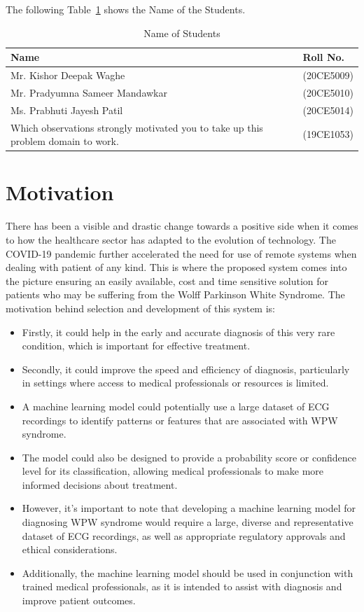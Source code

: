 The following Table~\ref{tab1} shows the Name of the Students.
\begin{table}[!ht] \label{tab1}
	\caption{Name of Students}
	\centering
	\begin{tabular}{|p{5cm}|p{5cm}|}
		\hline
		\textbf{Name}                  & \textbf{Roll No.} \\ \hline
		Mr. Kishor Deepak Waghe        & (20CE5009)        \\ \hline
		Mr. Pradyumna Sameer Mandawkar & (20CE5010)        \\ \hline
		Ms. Prabhuti Jayesh Patil      & (20CE5014)        \\ \hline
		Which observations strongly motivated you to take up this problem domain to work.      & (19CE1053)        \\ \hline
	\end{tabular}
\end{table}

\section{Motivation}
There has been a visible and drastic change towards a positive side when it comes to how the healthcare sector has adapted to the evolution of technology. The COVID-19 pandemic further accelerated the need for use of remote systems when dealing with patient of any kind. This is where the proposed system comes into the picture ensuring an easily available, cost and time sensitive solution for patients who may be suffering from the Wolff Parkinson White Syndrome. The motivation behind selection and development of this system is: 


\begin{itemize}
	\item Firstly, it could help in the early and accurate diagnosis of this very rare condition, which is important for effective treatment. 
	\item Secondly, it could improve the speed and efficiency of diagnosis, particularly in settings where access to medical professionals or resources is limited. 
	\item A machine learning model could potentially use a large dataset of ECG recordings to identify patterns or features that are associated with WPW syndrome. 
	\item The model could also be designed to provide a probability score or confidence level for its classification, allowing medical professionals to make more informed decisions about treatment. 
	\item However, it's important to note that developing a machine learning model for diagnosing WPW syndrome would require a large, diverse and representative dataset of ECG recordings, as well as appropriate regulatory approvals and ethical considerations.  
	\item Additionally, the machine learning model should be used in conjunction with trained medical professionals, as it is intended to assist with diagnosis and improve patient outcomes. 
\end{itemize}


